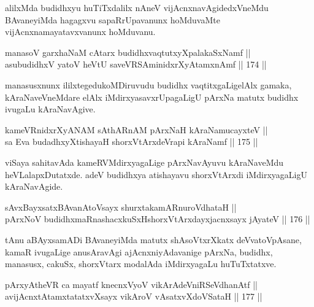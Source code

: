 \begin{artha}
alilxMda budidhxyu huTiTxdalilx nAneV vijAcnxnavAgidedxVneMdu
BAvaneyiMda hagagxvu sapaRrUpavanunx hoMduvaMte
vijAcnxnamayatavxvanunx hoMduvanu.
\end{artha}

\begin{shl}
manasoV garxhaNaM cAtarx budidhxvaqtutxyXpalakaSxNamf || \\
asubudidhxV yatoV heVtU saveVRSAminidxrXyAtamxnAmf \hfill || 174 ||  
\end{shl}

\begin{artha}
manasusxnunx ililxtegedukoMDiruvudu budidhx vaqtitxgaLigelAlx gamaka,
kAraNaveVneMdare elAlx iMdirxyasavxrUpagaLigU pArxNa matutx budidhx
ivugaLu kAraNavAgive.
\end{artha}

\begin{shl}
kameVRnidxrXyANAM sAthARnAM pArxNaH kAraNamucayxteV || \\
sa Eva budadhxyXtishayaH shorxVtArxdeVrapi kAraNamf \hfill || 175 ||  
\end{shl}

\begin{artha}
viSaya sahitavAda kameRVMdirxyagaLige pArxNavAyuvu
kAraNaveMdu heVLalapxDutatxde. adeV budidhxya atishayavu shorxVtArxdi
iMdirxyagaLigU kAraNavAgide.
\end{artha}


\begin{shl}
sAvxBayxsatxBAvanAtoV\s sayx shurxtakamARnuroVdhataH || \\
pArxNoV budidhxmaRnashacxkuSxHshorxVtArxdayxjacnxsayx jAyateV \hfill || 176 || 
\end{shl}

\begin{artha}
tAnu aBAyxsamADi BAvaneyiMda matutx shAsoVtxrXkatx deVvatoVpAsane,
kamaR ivugaLige anusAravAgi ajAcnxniyAdavanige pArxNa, budidhx,
manasusx, cakuSx, shorxVtarx modalAda iMdirxyagaLu huTuTxtatxve.
\end{artha}


\begin{shl}
pArxyAtheVR ca mayatf knecnxVyoV vikArAdeVniRSeVdhanAtf || \\
avijAcnxtAtamxtatatxvXsayx vikAroV vA\s satxvXdoVSataH \hfill || 177 ||  
\end{shl}

